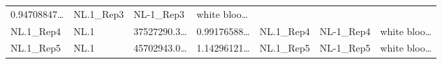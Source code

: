 \documentclass[
]{article}
\begin{document}
\begin{longtable}[]{@{}lllllll@{}}
\begin{minipage}[t]{0.13\columnwidth}
0.94708847\ldots{}\strut
\end{minipage} & \begin{minipage}[t]{0.12\columnwidth}\raggedright
NL.1\_Rep3\strut
\end{minipage} & \begin{minipage}[t]{0.12\columnwidth}\raggedright
NL-1\_Rep3\strut
\end{minipage} & \begin{minipage}[t]{0.13\columnwidth}\raggedright
white bloo\ldots{}\strut
\end{minipage}\tabularnewline
\begin{minipage}[t]{0.12\columnwidth}\raggedright
NL.1\_Rep4\strut
\end{minipage} & \begin{minipage}[t]{0.07\columnwidth}\raggedright
NL.1\strut
\end{minipage} & \begin{minipage}[t]{0.13\columnwidth}\raggedright
37527290.3\ldots{}\strut
\end{minipage} & \begin{minipage}[t]{0.13\columnwidth}\raggedright
0.99176588\ldots{}\strut
\end{minipage} & \begin{minipage}[t]{0.12\columnwidth}\raggedright
NL.1\_Rep4\strut
\end{minipage} & \begin{minipage}[t]{0.12\columnwidth}\raggedright
NL-1\_Rep4\strut
\end{minipage} & \begin{minipage}[t]{0.13\columnwidth}\raggedright
white bloo\ldots{}\strut
\end{minipage}\tabularnewline
\begin{minipage}[t]{0.12\columnwidth}\raggedright
NL.1\_Rep5\strut
\end{minipage} & \begin{minipage}[t]{0.07\columnwidth}\raggedright
NL.1\strut
\end{minipage} & \begin{minipage}[t]{0.13\columnwidth}\raggedright
45702943.0\ldots{}\strut
\end{minipage} & \begin{minipage}[t]{0.13\columnwidth}\raggedright
1.14296121\ldots{}\strut
\end{minipage} & \begin{minipage}[t]{0.12\columnwidth}\raggedright
NL.1\_Rep5\strut
\end{minipage} & \begin{minipage}[t]{0.12\columnwidth}\raggedright
NL-1\_Rep5\strut
\end{minipage} & \begin{minipage}[t]{0.13\columnwidth}\raggedright
white bloo\ldots{}\strut
\end{minipage}\tabularnewline
\bottomrule
\end{longtable}
\end{document}
